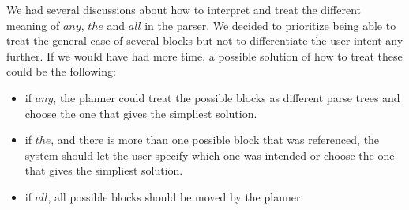 We had several discussions about how to interpret and treat the different
meaning of $any$, $the$ and $all$ in the parser. We decided to prioritize being
able to treat the general case of several blocks but not to differentiate the
user intent any further. If we would have had more time, a possible solution of
how to treat these could be the following: 

\begin{itemize}
\item if $any$, the planner could treat the possible blocks as different parse
    trees and choose the one that gives the simpliest solution.  
\item if $the$, and there is more than one possible block that was referenced,
    the system should let the user specify which one was intended or choose the
    one that gives the simpliest solution. 
\item if $all$, all possible blocks should be moved by the planner
\end{itemize}
